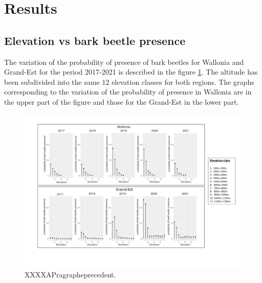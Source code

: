 \documentclass[3p,times]{elsarticle}
\begin{document}




	





\section{Results}

\subsection{ Elevation vs bark beetle presence}
The variation of the probability of presence of bark beetles for Wallonia and Grand-Est for the period 2017-2021 is described in the figure 
\ref{alti_sco}.
 The altitude has been subdivided into the same 12 elevation classes for both regions. The graphs corresponding to the variation of the probability of presence in Wallonia are in the upper part of the figure and those for the Grand-Est in the lower part.

\begin{figure}
\centering
	\includegraphics[width=\textwidth]{graphe_wall_GDE.png}
     \caption{XXXXAPragrapheprecedent.}
	\label{alti_sco}
\end{figure}
\end{document}

